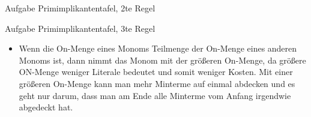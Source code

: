 \begin{frame}[allowframebreaks]{Aufgabe \thesection}{Primimplikantentafel, 2te Regel}
\begin{itemize}
  \end{itemize}
\end{frame}

\begin{frame}[allowframebreaks]{Aufgabe \thesection}{Primimplikantentafel, 3te Regel}
  \begin{itemize}
    \item Wenn die On-Menge eines Monoms Teilmenge der On-Menge eines anderen Monoms ist, dann nimmt das Monom mit der größeren On-Menge, da größere ON-Menge weniger Literale bedeutet und somit weniger Kosten. Mit einer größeren On-Menge kann man mehr Minterme auf einmal abdecken und es geht nur darum, dass man am Ende alle Minterme vom Anfang irgendwie abgedeckt hat.
  \end{itemize}
\end{frame}

